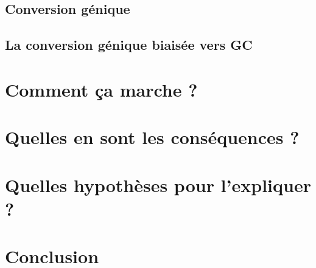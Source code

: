 \documentclass[11pt, oneside]{scrartcl}
\begin{document}
\subsection{Conversion génique}
\label{sec:orgheadline3}
\subsection{La conversion génique biaisée vers GC}
\label{sec:orgheadline4}
\section{Comment ça marche ?}
\label{sec:orgheadline6}
\section{Quelles en sont les conséquences ?}
\label{sec:orgheadline7}
\section{Quelles hypothèses pour l'expliquer ?}
\label{sec:orgheadline8}
\section{Conclusion}
\label{sec:orgheadline9}


\end{document}
